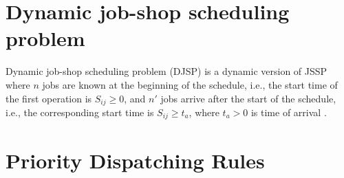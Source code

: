 \section{Dynamic job-shop scheduling problem}

Dynamic job-shop scheduling problem (DJSP) is a dynamic version of JSSP where $n$ jobs are known at the beginning of the schedule, i.e., the start time of the first operation is $S_{ij} \geq 0$, and $n'$ jobs arrive after the start of the schedule, i.e., the corresponding start time is $S_{ij} \geq t_a$, where $t_a > 0$ is time of arrival \cite{KUNDAKCI201631}.

\section{Priority Dispatching Rules}

